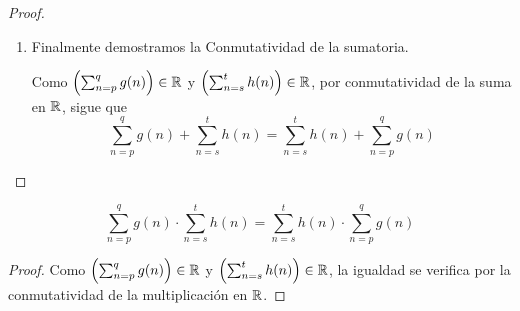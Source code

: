 \begin{enumerate}[label=\alph*)]
\begin{proof}
\begin{enumerate}[label=\Roman*.]
    \item Finalmente demostramos la Conmutatividad de la sumatoria.
    
    Como $\Bigl(\sum_{n=p}^{q} g(n)\Bigr)\in \mathbb{R}$ y $\Bigl(\sum_{n=s}^{t} h(n)\Bigr)\in \mathbb{R}$, por conmutatividad de la suma en $\mathbb{R}$, sigue que \[\sum_{n=p}^{q} g(n) + \sum_{n=s}^{t} h(n) = \sum_{n=s}^{t} h(n) + \sum_{n=p}^{q} g(n)\]
    \end{enumerate}
  \end{proof}

   \[\sum_{n=p}^{q} g(n) \cdot \sum_{n=s}^{t} h(n) = \sum_{n=s}^{t} h(n) \cdot \sum_{n=p}^{q} g(n)\]
  \begin{proof}\leavevmode
    Como $\Bigl(\sum_{n=p}^{q} g(n)\Bigr)\in \mathbb{R}$ y $\Bigl(\sum_{n=s}^{t} h(n)\Bigr)\in \mathbb{R}$, la igualdad se verifica por la conmutatividad de la multiplicación en $\mathbb{R}$.
  \end{proof}


\end{enumerate}
